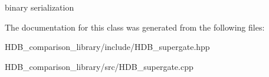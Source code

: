 binary serialization 

The documentation for this class was generated from the following files\+:\begin{DoxyCompactItemize}
\item 
H\+D\+B\+\_\+comparison\+\_\+library/include/H\+D\+B\+\_\+supergate.\+hpp\item 
H\+D\+B\+\_\+comparison\+\_\+library/src/H\+D\+B\+\_\+supergate.\+cpp\end{DoxyCompactItemize}
